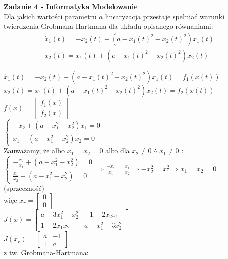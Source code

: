 \documentclass[a4paper,11pt]{article}
\begin{document}
\newpage
\begin{framed}
\textbf{Zadanie 4 - Informatyka Modelowanie } \\ 
Dla jakich wartości parametru \( a \) linearyzacja przestaje spełniać warunki twierdzenia Grobmana-Hartmana dla układu opisanego równaniami:
\begin{align*}
\dot{x}_{1}(t)=-x_{2}(t)+(a-x_{1}(t)^{2}-x_{2}(t)^{2})x_{1}(t) \\
\dot{x}_{2}(t)=x_{1}(t)+(a-x_{1}(t)^{2}-x_{2}(t)^{2})x_{2}(t)
\end{align*}
\end{framed}
$\dot{x_1}(t)=-x_2(t)+(a-x_1(t)^2-x_2(t)^2)x_1(t)=f_1(x(t))$\\
$\dot{x_2}(t)=x_1(t)+(a-x_1(t)^2-x_2(t)^2)x_2(t)=f_2(x(t))$\\
$f(x)=\left[ \begin{array}{c}     f_1(x) \\ f_2(x)   \end{array}\right]$\\
$\begin{cases} -x_2+(a-x_1^2-x_2^2)x_1=0 \\ x_1+(a-x_1^2-x_2^2)x_2=0\end{cases}  $\\
Zauważamy, że albo $x_1=x_2=0$ albo dla $x_2 \neq 0 \wedge x_1 \neq 0$ :\\
$\begin{cases} -\frac{x_2}{x_1}+(a-x_1^2-x_2^2)=0 \\ \frac{x_1}{x_2}+(a-x_1^2-x_2^2)=0\end{cases}  \Rightarrow \frac{-x_2}{x_1} = \frac{x_1}{x_2} \Rightarrow -x_2^2=x_1^2 \Rightarrow x_1=x_2=0$ (sprzeczność)\\
więc $x_r=\left[ \begin{array}{c}     0\\0   \end{array}\right]$\\
$J(x)=\left[ \begin{array}{cc}   a-3x_1^2-x_2^2 & -1-2x_2x_1 \\ 1-2x_1x_2 & a-x_1^2-3x_2^2    \end{array}\right]$\\
$J(x_r)=\left[ \begin{array}{cc}    a & -1 \\ 1 & a    \end{array}\right]$\\
z tw. Grobmana-Hartmana:\\
\end{document}
